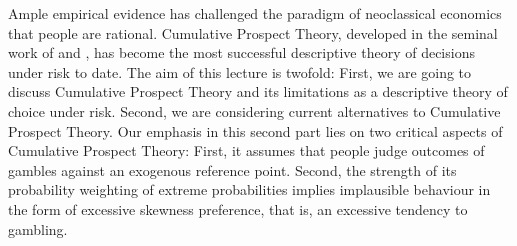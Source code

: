 


\renewcommand{\blindmarkup}[1]{\emph{#1}}
\blindmathfalse


Ample empirical evidence has challenged the paradigm of neoclassical economics that people are rational.
Cumulative Prospect Theory, developed in the seminal work of \citet{KahnemanTversky1979} and  \citet{TverskyKahneman1992}, has become the most successful descriptive theory of decisions under risk to date.
The aim of this lecture is twofold: First, we are going to discuss Cumulative Prospect Theory and its limitations as a descriptive theory of choice under risk.
Second, we are considering current alternatives to Cumulative Prospect Theory.
Our emphasis in this second part lies on two critical aspects of Cumulative Prospect Theory: First, it assumes that people judge outcomes of gambles against an exogenous reference point.
Second, the strength of its probability weighting of extreme probabilities implies implausible behaviour in the form of excessive skewness preference, that is, an excessive tendency to gambling.


\nocite{EbertStrack2015,EbertStrack2018Unpublished, Barberis2012a}\nocite{KoeszegiRabin2006,KoeszegiRabin2007,Shefrin2008,Starmer2000,Wakker2010}
\nocite{BordaloGennaioliShleifer2012,BordaloGennaioliShleifer2013a,BordaloGennaioliShleifer2013b}
\nocite{Rabin1998, Rabin2000, Thaler2016, Barberis2013a,Barberis2013b}
\nocite{AzevedoGottlieb2012}
